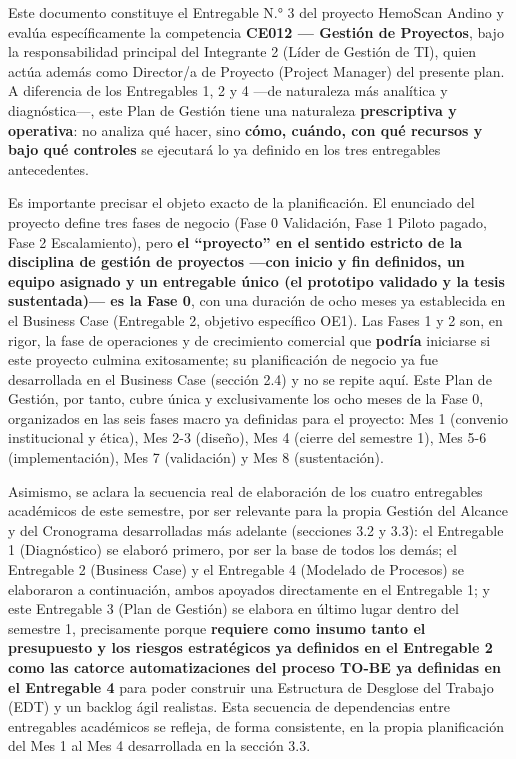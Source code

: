 \documentclass[11pt,a4paper]{article}
\begin{document}
Este documento constituye el Entregable N.° 3 del proyecto HemoScan Andino y evalúa específicamente la competencia \textbf{CE012 --- Gestión de Proyectos}, bajo la responsabilidad principal del Integrante 2 (Líder de Gestión de TI), quien actúa además como Director/a de Proyecto (Project Manager) del presente plan. A diferencia de los Entregables 1, 2 y 4 ---de naturaleza más analítica y diagnóstica---, este Plan de Gestión tiene una naturaleza \textbf{prescriptiva y operativa}: no analiza qué hacer, sino \textbf{cómo, cuándo, con qué recursos y bajo qué controles} se ejecutará lo ya definido en los tres entregables antecedentes.

Es importante precisar el objeto exacto de la planificación. El enunciado del proyecto define tres fases de negocio (Fase 0 Validación, Fase 1 Piloto pagado, Fase 2 Escalamiento), pero \textbf{el ``proyecto'' en el sentido estricto de la disciplina de gestión de proyectos ---con inicio y fin definidos, un equipo asignado y un entregable único (el prototipo validado y la tesis sustentada)--- es la Fase 0}, con una duración de ocho meses ya establecida en el Business Case (Entregable 2, objetivo específico OE1). Las Fases 1 y 2 son, en rigor, la fase de operaciones y de crecimiento comercial que \textbf{podría} iniciarse si este proyecto culmina exitosamente; su planificación de negocio ya fue desarrollada en el Business Case (sección 2.4) y no se repite aquí. Este Plan de Gestión, por tanto, cubre única y exclusivamente los ocho meses de la Fase 0, organizados en las seis fases macro ya definidas para el proyecto: Mes 1 (convenio institucional y ética), Mes 2-3 (diseño), Mes 4 (cierre del semestre 1), Mes 5-6 (implementación), Mes 7 (validación) y Mes 8 (sustentación).

Asimismo, se aclara la secuencia real de elaboración de los cuatro entregables académicos de este semestre, por ser relevante para la propia Gestión del Alcance y del Cronograma desarrolladas más adelante (secciones 3.2 y 3.3): el Entregable 1 (Diagnóstico) se elaboró primero, por ser la base de todos los demás; el Entregable 2 (Business Case) y el Entregable 4 (Modelado de Procesos) se elaboraron a continuación, ambos apoyados directamente en el Entregable 1; y este Entregable 3 (Plan de Gestión) se elabora en último lugar dentro del semestre 1, precisamente porque \textbf{requiere como insumo tanto el presupuesto y los riesgos estratégicos ya definidos en el Entregable 2 como las catorce automatizaciones del proceso TO-BE ya definidas en el Entregable 4} para poder construir una Estructura de Desglose del Trabajo (EDT) y un backlog ágil realistas. Esta secuencia de dependencias entre entregables académicos se refleja, de forma consistente, en la propia planificación del Mes 1 al Mes 4 desarrollada en la sección 3.3.
\end{document}
